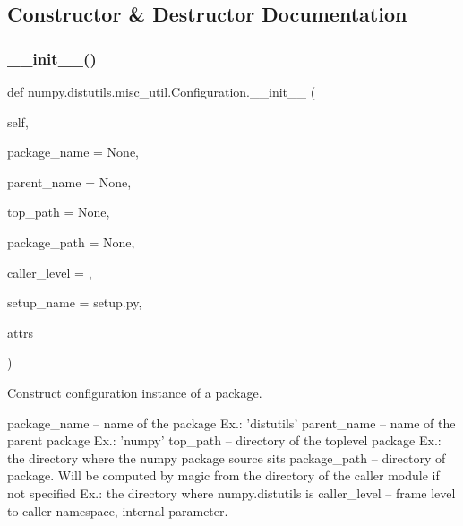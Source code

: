 \subsection{Constructor \& Destructor Documentation}
\mbox{\label{classnumpy_1_1distutils_1_1misc__util_1_1Configuration_a6c4d256d49799aec23aa601e46efa1a0}} 
\subsubsection{\texorpdfstring{\+\_\+\+\_\+init\+\_\+\+\_\+()}{\_\_init\_\_()}}
{\footnotesize\ttfamily def numpy.\+distutils.\+misc\+\_\+util.\+Configuration.\+\_\+\+\_\+init\+\_\+\+\_\+ (\begin{DoxyParamCaption}\item[{}]{self,  }\item[{}]{package\+\_\+name = {\ttfamily None},  }\item[{}]{parent\+\_\+name = {\ttfamily None},  }\item[{}]{top\+\_\+path = {\ttfamily None},  }\item[{}]{package\+\_\+path = {\ttfamily None},  }\item[{}]{caller\+\_\+level = {},  }\item[{}]{setup\+\_\+name = {\ttfamily \textquotesingle{}setup.py\textquotesingle{}},  }\item[{}]{attrs }\end{DoxyParamCaption})}

\begin{DoxyVerb}Construct configuration instance of a package.

package_name -- name of the package
        Ex.: 'distutils'
parent_name  -- name of the parent package
        Ex.: 'numpy'
top_path     -- directory of the toplevel package
        Ex.: the directory where the numpy package source sits
package_path -- directory of package. Will be computed by magic from the
        directory of the caller module if not specified
        Ex.: the directory where numpy.distutils is
caller_level -- frame level to caller namespace, internal parameter.
\end{DoxyVerb}
 

